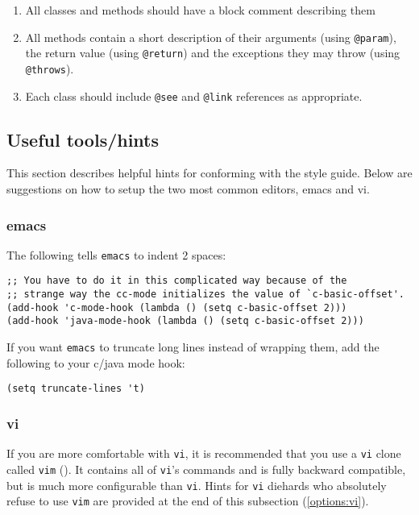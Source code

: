 \begin{enumerate}
\item All classes and methods should have a block comment describing
them
\item All methods contain a short description of their arguments
(using {\tt @param}), the return value (using {\tt @return}) and the
exceptions they may throw (using {\tt @throws}).
\item Each class should include {\tt @see} and {\tt @link} 
references as appropriate.
\end{enumerate}

\subsection {Useful tools/hints}

This section describes helpful hints for conforming with the style
guide.  Below are suggestions on how to setup the two most common
editors, emacs and vi. 

\subsubsection{emacs} 

The following tells {\tt emacs} to indent 2 spaces:
\begin{verbatim}
;; You have to do it in this complicated way because of the
;; strange way the cc-mode initializes the value of `c-basic-offset'.
(add-hook 'c-mode-hook (lambda () (setq c-basic-offset 2)))
(add-hook 'java-mode-hook (lambda () (setq c-basic-offset 2)))
\end{verbatim}
If you want {\tt emacs} to truncate long lines instead of wrapping them, add
the following to your c/java mode hook:
\begin{verbatim}
(setq truncate-lines 't)
\end{verbatim}

\subsubsection{vi}\label{options:vi/vim}

If you are more comfortable with {\tt vi}, it is recommended that you
use a {\tt vi} clone called {\tt vim} ().  It
contains all of {\tt vi}'s commands and is fully backward compatible,
but is much more configurable than {\tt vi}.  Hints for {\tt vi}
diehards who absolutely refuse to use {\tt vim} are provided at the end
of this subsection (\ref{options:vi}).

